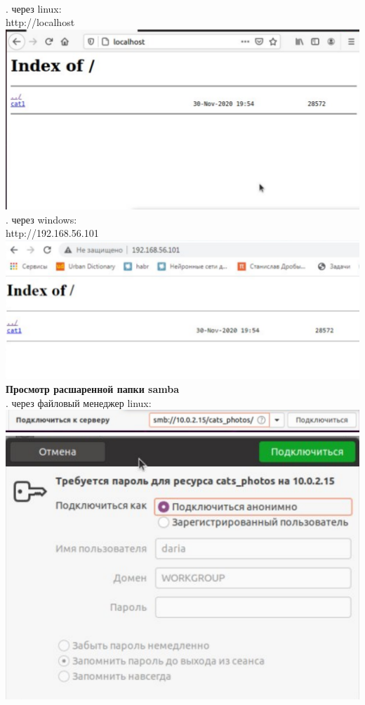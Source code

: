\documentclass[12pt,a4paper]{scrartcl}
\begin{document}
\\[5pt]
. через linux: \\[5pt]
http://localhost \\[5pt]
\includegraphics[scale=10, width=15cm]{f5}
\\[5pt]
. через windows: \\[5pt] 
http://192.168.56.101 \\[5pt]
\includegraphics[scale=10, width=15cm]{f6} \\[5pt]
\textbf{Просмотр расшаренной папки samba} \\[5pt]
. через файловый менеджер linux: \\[5pt]
\includegraphics[scale=10, width=15cm]{f7} \\[5pt]
\includegraphics[scale=10, width=15cm]{f71} \\[5pt]
\end{document}
